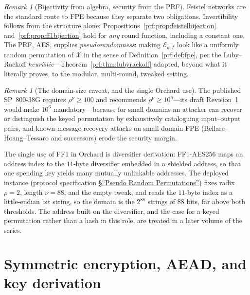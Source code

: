 \documentclass[11pt,a4paper]{article}
\theoremstyle{definition}
\theoremstyle{remark}
\newtheorem{remark}[theorem]{Remark}
\begin{document}
\begin{remark}[Bijectivity from algebra, security from the PRF]
\label{prf:rem:fpe-separation}
Feistel networks are the standard route to FPE because they separate
two obligations. Invertibility follows from the structure alone:
Propositions~\ref{prf:prop:feistelbijection}
and~\ref{prf:prop:ff1bijection} hold for \emph{any} round function,
including a constant one. The PRF, AES, supplies
\emph{pseudorandomness}: making \(\mathcal{E}_{k,T}\) look like a
uniformly random permutation of \(\mathcal{X}\) in the sense of
Definition~\ref{prf:def:fpe}, per the Luby--Rackoff
\emph{heuristic}---Theorem~\ref{prf:thm:lubyrackoff} adapted, beyond
what it literally proves, to the modular, multi-round, tweaked
setting.
\end{remark}

\begin{remark}[The domain-size caveat, and the single Orchard use]
\label{prf:rem:ff1-deployed}
The published SP~800-38G requires
\(\rho^{\nu} \ge 100\) and recommends \(\rho^{\nu} \ge 10^{6}\)---its
draft Revision~1 would make \(10^{6}\) mandatory---because for
small domains an attacker can recover or distinguish the keyed
permutation by exhaustively cataloguing input--output pairs, and known
message-recovery attacks on small-domain FPE (Bellare--Hoang--Tessaro
and successors) erode the security margin.

The single use of FF1 in Orchard is diversifier derivation: FF1-AES256
maps an address index to the \(11\)-byte diversifier embedded in a
shielded address, so that one spending key yields many mutually
unlinkable addresses. The deployed
instance (protocol specification
\href{https://zips.z.cash/protocol/protocol.pdf\#concreteprps}{\S``Pseudo Random
Permutations''}) fixes radix \(\rho = 2\), length \(\nu = 88\), and the
empty tweak, and reads the \(11\)-byte index as a little-endian bit
string, so the domain is the \(2^{88}\) strings of \(88\)
bits, far above both thresholds. The address built on the
diversifier, and the case for a keyed permutation rather than a hash
in this role, are treated in a later volume of the series.
\end{remark}

\section{Symmetric encryption, AEAD, and key derivation}\label{sec:symmetric}
\end{document}
